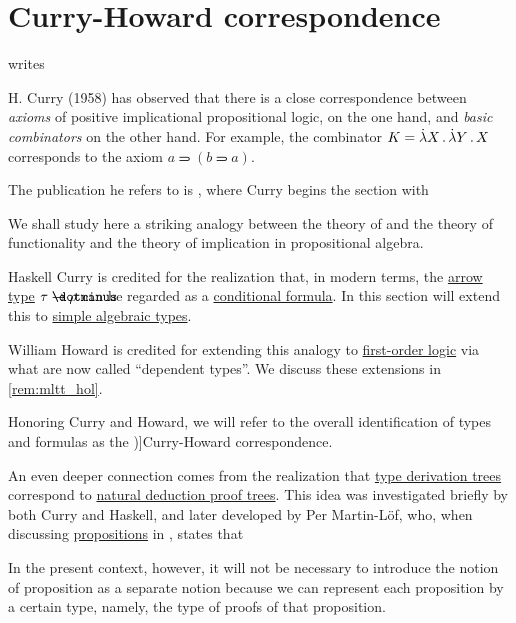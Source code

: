 \section{Curry-Howard correspondence}\label{sec:curry_howard_correspondence}

\begin{concept}\label{con:curry_howard_correspondence}
   writes
  \begin{displayquote}
    H. Curry (1958) has observed that there is a close correspondence between \textit{axioms} of positive implicational propositional logic, on the one hand, and \textit{basic combinators} on the other hand. For example, the combinator \( K = \qabs X \qabs Y X \) corresponds to the axiom \( a \rightimply (b \rightimply a) \).
  \end{displayquote}

  The publication he refers to is \cite[312]{CurryFeysCraig1958CombinatoryLogicVol1}, where Curry begins the section with
  \begin{displayquote}
    We shall study here a striking analogy between the theory of and the theory of functionality and the theory of implication in propositional algebra.
  \end{displayquote}

  Haskell Curry is credited for the realization that, in modern terms, the \hyperref[def:arrow_type]{arrow type} \( \tau \synimplies \rho \) can be regarded as a \hyperref[def:propositional_alphabet/connectives/conditional]{conditional formula}. In this section will extend this to \hyperref[def:simple_algebraic_types]{simple algebraic types}.

  William Howard is credited for extending this analogy to \hyperref[sec:first_order_logic]{first-order logic} via what are now called \enquote{dependent types}. We discuss these extensions in \cref{rem:mltt_hol}.

  Honoring Curry and Howard, we will refer to the overall identification of types and formulas as the \term[en=Curry-Howard correspondence (\cite[def. 4.1.7]{Mimram2020ProgramEqualsProof})]{Curry-Howard correspondence}.

  An even deeper connection comes from the realization that \hyperref[def:type_derivation_tree]{type derivation trees} correspond to \hyperref[def:natural_deduction_proof_tree]{natural deduction proof trees}. This idea was investigated briefly by both Curry and Haskell, and later developed by Per Martin-L\"of, who, when discussing \hyperref[con:proposition]{propositions} in \cite[76]{MartinLöf1975IntuitionisticTypeTheory}, states that
  \begin{displayquote}
    In the present context, however, it will not be necessary to introduce the notion of proposition as a separate notion because we can represent each proposition by a certain type, namely, the type of proofs of that proposition.
  \end{displayquote}
\end{concept}

